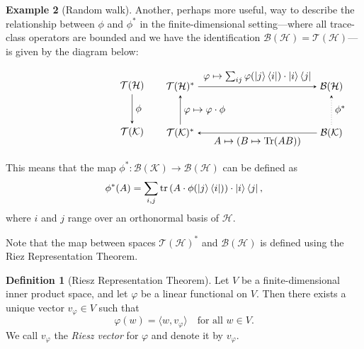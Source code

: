 \documentclass[10pt,a4paper]{amsart}
\theoremstyle{definition}
\newtheorem{definition}{Definition}[section]
\theoremstyle{definition}
\newtheorem{example}[definition]{Example}
\theoremstyle{definition}
\theoremstyle{definition}
\theoremstyle{definition}
\theoremstyle{definition}
\begin{document}
\begin{example}[Random walk]
Another, perhaps more useful, way to describe the relationship between $\phi$ and $\phi^*$ in the finite-dimensional setting—where all trace-class operators are bounded and we have the identification \( \mathcal{B}(\mathcal{H}) = \mathcal{T}(\mathcal{H}) \)—is given by the diagram below:

\[
\begin{minipage}{0.45\textwidth}
\centering
\begin{tikzpicture}
  \matrix (m) [matrix of math nodes,row sep=3em,column sep=2em,minimum width=1em]
  { 
    \mathcal{T}(\mathcal{H}) \\
     \mathcal{T}(\mathcal{K})  \\
  };
  \path[-stealth]
    (m-1-1) edge  node [right] {$\phi$} (m-2-1);
\end{tikzpicture}
\end{minipage}
\hspace{-50pt}
\begin{minipage}{0.45\textwidth}
\centering
\begin{tikzpicture}
  \matrix (m) [matrix of math nodes,row sep=3em,column sep=12em,minimum width=1em]
  {
  \mathcal{T}(\mathcal{H})^*&  \mathcal{B}(\mathcal{H})  \\
   \mathcal{T}(\mathcal{K})^* &  \mathcal{B}(\mathcal{K}) \\
  };
  \path[-stealth]
    (m-1-1) edge  node [above] {$\varphi \mapsto \sum_{ij} \varphi(\ket{j}\bra{i}) \cdot \ket{i} \bra{j}  $} (m-1-2)
    (m-2-2) edge [dotted]  node [right] {$\phi^*$} (m-1-2)
    (m-2-2) edge  node [below] {$ A \mapsto (B \mapsto \tr(AB)) $} (m-2-1)
    (m-2-1) edge  node [right] {$ \varphi \mapsto \varphi \cdot \phi $} (m-1-1)
    ;
\end{tikzpicture}
\end{minipage}
\]


This means that the map $\phi^* : \mathcal{B}(\mathcal{K}) \to \mathcal{B}(\mathcal{H})$ can be defined as
\[
\phi^*(A) = \sum_{i,j} \operatorname{tr}\left(A \cdot \phi(\ket{j}\bra{i})\right) \cdot \ket{i}\bra{j},
\]
where \( i \) and \( j \) range over an orthonormal basis of \( \mathcal{H} \). 

Note that the map between spaces $\mathcal{T}(\mathcal{H})^*$ and $\mathcal{B}(\mathcal{H})$ is defined using the Riez Representation Theorem.

\begin{definition} [Riesz Representation Theorem]
Let $V$ be a finite-dimensional inner product space, and let $\varphi$ be a linear functional on $V$. Then there exists a unique vector $v_\varphi \in V$ such that
$$
\varphi(w) = \langle w, v_\varphi \rangle \quad \text{for all } w \in V.
$$
We call $v_\varphi$ the \emph{Riesz vector} for $\varphi$ and denote it by $v_\varphi$.\\
\end{definition}


\end{example}
\end{document}

